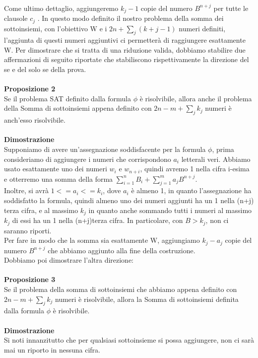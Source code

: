 \\Come ultimo dettaglio, aggiungeremo $k_j - 1$ copie del numero $B^{n+j}$ per tutte le clausole $c_j$ . In questo modo definito il nostro problema della somma dei sottoinsiemi, con l'obiettivo W e i $2n + \sum_{j} (k+j-1) $ numeri definiti, l'aggiunta di questi numeri aggiuntivi ci permetterà di raggiungere esattamente W.
Per dimostrare che si tratta di una riduzione valida, dobbiamo stabilire due affermazioni di seguito riportate che stabiliscono rispettivamente la direzione del se e del solo se della prova.\\\\
\textbf{Proposizione 2}\\
Se il problema SAT definito dalla formula $\phi$ è risolvibile, allora anche il problema della Somma di sottoinsiemi appena definito con $2n - m + \sum_{j} k_j$ numeri è anch'esso risolvibile.
\\\\\textbf{Dimostrazione}
\\Supponiamo di avere un'assegnazione soddisfacente per la formula $\phi$, prima consideriamo di aggiungere i numeri che corrispondono $a_i$ letterali veri. Abbiamo usato esattamente uno dei numeri $w_i$ e $w_{n+i}$, quindi avremo 1 nella cifra i-esima e otterremo una somma della forma $\sum_{i=1}^n B_i + \sum_{j=1}^m a_j B^{n+j}$.
\\Inoltre, si avrà $1 <= a_i <= k_i$, dove $a_i$ è almeno 1, in quanto l'assegnazione ha soddisfatto la formula, quindi almeno uno dei numeri aggiunti ha un 1 nella (n+j) terza cifra, e al massimo $k_j$ in quanto anche sommando tutti i numeri al massimo $k_j$ di essi ha un 1 nella (n+j)terza cifra. In particolare, con $B > k_j$, non ci saranno riporti.
\\Per fare in modo che la somma sia esattamente W, aggiungiamo $k_j - a_j$ copie del numero $B^{n+j}$ che abbiamo aggiunto alla fine della costruzione.
\\Dobbiamo poi dimostrare l'altra direzione:
\\\\\textbf{Proposizione 3}
\\ Se il problema della somma di sottoinsiemi che abbiamo appena definito con $2n - m + \sum_{j} k_j$ numeri è risolvibile, allora la Somma di sottoinsiemi definita dalla formula $\phi$ è risolvibile.\\\\
\textbf{Dimostrazione}\\
Si noti innanzitutto che per qualsiasi sottoinsieme si possa aggiungere, non ci sarà mai un riporto in nessuna cifra. 

